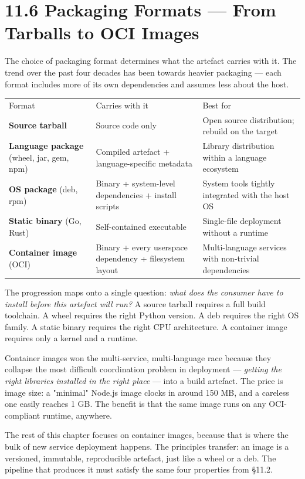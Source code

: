 \documentclass[11pt,a4paper]{book}
\begin{document}
\medskip

\section{11.6 Packaging Formats --- From Tarballs to OCI Images}

The choice of packaging format determines what the artefact carries with it. The trend over the past four decades has been towards heavier packaging --- each format includes more of its own dependencies and assumes less about the host.

\begin{tabular}{lll}
\hline
Format & Carries with it & Best for \\
\textbf{Source tarball} & Source code only & Open source distribution; rebuild on the target \\
\textbf{Language package} (wheel, jar, gem, npm) & Compiled artefact + language-specific metadata & Library distribution within a language ecosystem \\
\textbf{OS package} (deb, rpm) & Binary + system-level dependencies + install scripts & System tools tightly integrated with the host OS \\
\textbf{Static binary} (Go, Rust) & Self-contained executable & Single-file deployment without a runtime \\
\textbf{Container image} (OCI) & Binary + every userspace dependency + filesystem layout & Multi-language services with non-trivial dependencies \\
\hline
\end{tabular}

The progression maps onto a single question: \textit{what does the consumer have to install before this artefact will run?} A source tarball requires a full build toolchain. A wheel requires the right Python version. A deb requires the right OS family. A static binary requires the right CPU architecture. A container image requires only a kernel and a runtime.

Container images won the multi-service, multi-language race because they collapse the most difficult coordination problem in deployment --- \textit{getting the right libraries installed in the right place} --- into a build artefact. The price is image size: a "minimal" Node.js image clocks in around 150 MB, and a careless one easily reaches 1 GB. The benefit is that the same image runs on any OCI-compliant runtime, anywhere.

The rest of this chapter focuses on container images, because that is where the bulk of new service deployment happens. The principles transfer: an image is a versioned, immutable, reproducible artefact, just like a wheel or a deb. The pipeline that produces it must satisfy the same four properties from §11.2.
\end{document}
